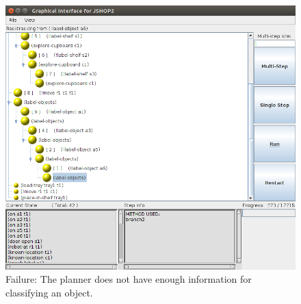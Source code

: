 \documentclass{beamer}
\begin{document}
		\begin{frame}
		
		\begin{figure} [ht!]
			\centering
			\includegraphics[width=0.7\linewidth]{images/failure-1}
			\caption{Failure: The planner does not have enough information for classifying an object.}
			\label{fig:failure-1}
		\end{figure}
		
		\end{frame}
		


	
\end{document}
